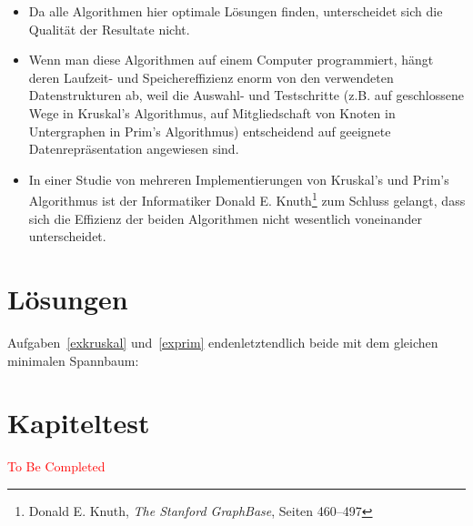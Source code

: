 \documentclass[12pt,a4paper]{report}
\theoremstyle{break}
\theoremstyle{plain}
\begin{document}
\begin{itemize}
\item Da alle Algorithmen hier optimale L\"{o}sungen finden,
  unterscheidet sich die Qualit\"{a}t der Resultate nicht.
\item Wenn man diese Algorithmen auf einem Computer programmiert,
  h\"{a}ngt deren Laufzeit- und Speichereffizienz enorm von den
  verwendeten Datenstrukturen ab, weil die Auswahl- und Testschritte
  (z.B. auf geschlossene Wege in Kruskal's Algorithmus, auf
  Mitgliedschaft von Knoten in Untergraphen in Prim's Algorithmus)
  entscheidend auf geeignete Datenrepr\"{a}sentation angewiesen sind.
\item In einer Studie von mehreren Implementierungen von Kruskal's und
  Prim's Algorithmus ist der Informatiker Donald
  E. Knuth\footnote{Donald E. Knuth, \emph{The Stanford GraphBase},
    Seiten 460--497} zum Schluss
  gelangt, dass sich die Effizienz der beiden Algorithmen nicht
  wesentlich voneinander unterscheidet.
\end{itemize}

\section{L\"{o}sungen}

Aufgaben~\ref{exkruskal} und~\ref{exprim} endenletztendlich beide mit
dem gleichen minimalen Spannbaum:


\section{Kapiteltest}
\textcolor{red}{To Be Completed}
\end{document}
